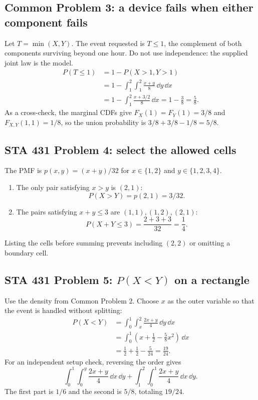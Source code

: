 \subsection*{Common Problem 3: a device fails when either component fails}
Let $T=\min(X,Y)$. The event requested is $T\leq1$, the complement of both components surviving beyond one hour. Do not use independence: the supplied joint law is the model.
\[
\begin{aligned}
 P(T\leq1)
 &=1-P(X>1,Y>1)\\
 &=1-\int_1^2\int_1^2\frac{x+y}{8}\,\dd y\,\dd x\\
 &=1-\int_1^2\frac{x+3/2}{8}\,\dd x
 =1-\frac38=\boxed{\frac58}.
\end{aligned}
\]
As a cross-check, the marginal CDFs give $F_X(1)=F_Y(1)=3/8$ and $F_{X,Y}(1,1)=1/8$, so the union probability is $3/8+3/8-1/8=5/8$.

\subsection*{STA 431 Problem 4: select the allowed cells}
The PMF is $p(x,y)=(x+y)/32$ for $x\in\{1,2\}$ and $y\in\{1,2,3,4\}$.
\begin{enumerate}[label=(\alph*),leftmargin=*]
\item The only pair satisfying $x>y$ is $(2,1)$:
\[
 \boxed{P(X>Y)=p(2,1)=3/32}.
\]
\item The pairs satisfying $x+y\leq3$ are $(1,1),(1,2),(2,1)$:
\[
 \boxed{P(X+Y\leq3)=\frac{2+3+3}{32}=\frac14}.
\]
\end{enumerate}
Listing the cells before summing prevents including $(2,2)$ or omitting a boundary cell.

\subsection*{STA 431 Problem 5: $P(X<Y)$ on a rectangle}
Use the density from Common Problem 2. Choose $x$ as the outer variable so that the event is handled without splitting:
\[
\begin{aligned}
 P(X<Y)
 &=\int_0^1\int_x^2\frac{2x+y}{4}\,\dd y\,\dd x\\
 &=\int_0^1\left(x+\frac12-\frac58x^2\right)\,\dd x\\
 &=\frac12+\frac12-\frac5{24}
 =\boxed{\frac{19}{24}}.
\end{aligned}
\]
For an independent setup check, reversing the order gives
\[
 \int_0^1\int_0^y\frac{2x+y}{4}\,\dd x\,\dd y
 +\int_1^2\int_0^1\frac{2x+y}{4}\,\dd x\,\dd y.
\]
The first part is $1/6$ and the second is $5/8$, totaling $19/24$.


